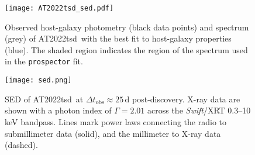\documentclass{nature_plusfigure}
\newcommand{\at}{AT2022tsd}
\begin{document}
\begin{supplement}
\begin{figure}[!ht]
 \centering
\texttt{[image: AT2022tsd\_sed.pdf]}
  \caption{Observed host-galaxy photometry (black data points) and spectrum (grey) of \at\ with the best fit to host-galaxy properties (blue). The shaded region indicates the region of the spectrum used in the \texttt{prospector} fit.
}
 \label{fig:host-fit}
\end{figure}

\begin{figure}[!ht]
 \centering
\texttt{[image: sed.png]}
  \caption{SED of \at\ at $\Delta t_\mathrm{obs}\approx25\,$d post-discovery. X-ray data are shown with a photon index of $\Gamma=2.01$ across the {\it Swift}/XRT 0.3--10\,keV bandpass. Lines mark power laws connecting the radio to submillimeter data (solid), and the millimeter to X-ray data (dashed).}
 \label{fig:full-sed}
\end{figure}


\end{supplement}
\end{document}
